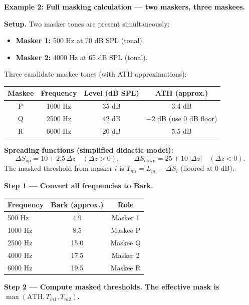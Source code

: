 \begin{examplebox}
\textbf{Example 2: Full masking calculation --- two maskers, three maskees.}

\medskip
\noindent\textbf{Setup.} Two masker tones are present simultaneously:
\begin{itemize}[nosep]
    \item \textbf{Masker 1:} 500 Hz at 70 dB SPL (tonal).
    \item \textbf{Masker 2:} 4000 Hz at 65 dB SPL (tonal).
\end{itemize}
Three candidate maskee tones (with ATH approximations):
\begin{center}
\begin{tabular}{cccc}
\toprule
Maskee & Frequency & Level (dB SPL) & ATH (approx.) \\
\midrule
P & 1000 Hz & 35 dB & 3.4 dB \\
Q & 2500 Hz & 42 dB & $-2$ dB (use 0 dB floor) \\
R & 6000 Hz & 20 dB & 5.5 dB \\
\bottomrule
\end{tabular}
\end{center}

\noindent\textbf{Spreading functions (simplified didactic model):}
\[
\Delta S_{\text{up}} = 10 + 2.5\,\Delta z \quad (\Delta z > 0),
\qquad
\Delta S_{\text{down}} = 25 + 10\,|\Delta z| \quad (\Delta z < 0).
\]
The masked threshold from masker $i$ is $T_{mi} = L_{m_i} - \Delta S_i$ (floored at 0 dB).

\medskip
\noindent\textbf{Step 1 --- Convert all frequencies to Bark.}

\begin{center}
\begin{tabular}{lcc}
\toprule
Frequency & Bark (approx.) & Role \\
\midrule
500 Hz   & 4.9  & Masker 1 \\
1000 Hz  & 8.5  & Maskee P \\
2500 Hz  & 15.0 & Maskee Q \\
4000 Hz  & 17.5 & Masker 2 \\
6000 Hz  & 19.5 & Maskee R \\
\bottomrule
\end{tabular}
\end{center}

\medskip
\noindent\textbf{Step 2 --- Compute masked thresholds. The effective mask is $\max(\text{ATH}, T_{m1}, T_{m2})$.}


\end{examplebox}
